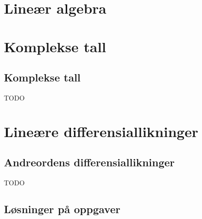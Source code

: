 
\newcommand{\kapittel}[2]{\chapter{#2}}
\newcommand{\kapittelslutt}{}



\def\inkludert{1}


\setlength{\cftpartnumwidth}{3em}

\frontmatter
\tableofcontents*


\mainmatter
\part{Lineær algebra}







\part{Komplekse tall}

\chapter{Komplekse tall}

TODO

\part{Lineære differensiallikninger}

\chapter{Andreordens differensiallikninger}

TODO


\backmatter

\chapter{Løsninger på oppgaver}







